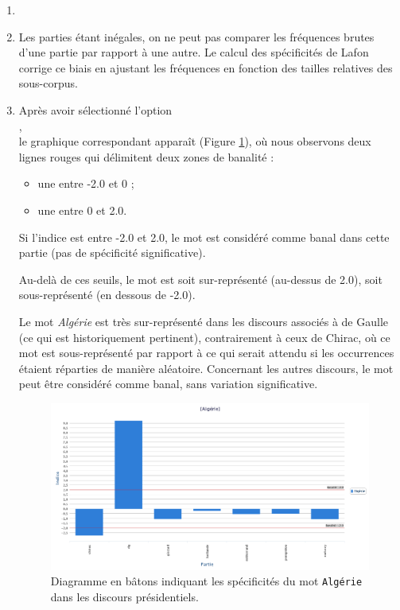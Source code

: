 \documentclass[xcolor={table,usenames,dvipsnames}]{article}
\begin{document}
\begin{enumerate}

 	\item {}
 	
 	\item Les parties étant inégales, on ne peut pas comparer les fréquences brutes d'une partie par rapport à une autre. Le calcul des spécificités de Lafon corrige ce biais en ajustant les fréquences en fonction des tailles relatives des sous-corpus.
 	\item Après avoir sélectionné l'option\\ ,\\
 	 le graphique correspondant apparaît (Figure \ref{fig:specificites_algerie}), où nous observons deux lignes rouges qui délimitent deux zones de banalité : \begin{itemize}
 		\item une entre -2.0 et 0 ;
 		 \item une entre 0 et 2.0.
 		\end{itemize}
 		Si l'indice est entre -2.0 et 2.0, le mot est considéré comme banal dans cette partie (pas de spécificité significative).
 		
 		Au-delà de ces seuils, le mot est soit sur-représenté (au-dessus de 2.0), soit sous-représenté (en dessous de -2.0).
 		
 		Le mot \textit{Algérie} est très sur-représenté dans les discours associés à de Gaulle (ce qui est historiquement pertinent), contrairement à ceux de Chirac, où ce mot est sous-représenté par rapport à ce qui serait attendu si les occurrences étaient réparties de manière aléatoire. Concernant les autres discours, le mot peut être considéré comme banal, sans variation significative.
 	\begin{figure}[H] %
 		\centering
 		\includegraphics[width=1\linewidth]{img/Algerie.png}
 		\caption{Diagramme en bâtons indiquant les spécificités du mot \texttt{Algérie} dans les discours présidentiels.}
 		\label{fig:specificites_algerie}
 	\end{figure}


\end{enumerate}
\end{document}
